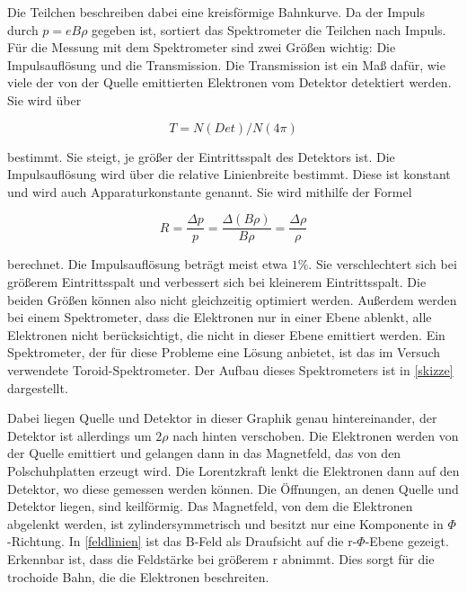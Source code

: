 Die Teilchen beschreiben dabei eine kreisförmige Bahnkurve. Da der Impuls durch $p = eB\rho$ gegeben ist, sortiert das Spektrometer die Teilchen nach Impuls. Für die Messung mit dem Spektrometer sind zwei Größen wichtig: Die Impulsauflösung und die Transmission. Die Transmission ist ein Maß dafür, wie viele der von der Quelle emittierten Elektronen vom Detektor detektiert werden. Sie wird über

\begin{equation}
T = N(Det)/N(4\pi)
\label{eq:transmission}
\end{equation}

bestimmt. Sie steigt, je größer der Eintrittsspalt des Detektors ist. Die Impulsauflösung wird über die relative Linienbreite bestimmt. Diese ist konstant und wird auch Apparaturkonstante genannt. Sie wird mithilfe der Formel

\begin{equation}
R = \frac{\Delta p}{p} = \frac{\Delta(B\rho)}{B\rho} = \frac{\Delta\rho}{\rho}
\label{eq:apparaturkonstante}
\end{equation}

berechnet. Die Impulsauflösung beträgt meist etwa $1\%$. Sie verschlechtert sich bei größerem Eintrittsspalt und verbessert sich bei kleinerem Eintrittsspalt. Die beiden Größen können also nicht gleichzeitig optimiert werden. Außerdem werden bei einem Spektrometer, dass die Elektronen nur in einer Ebene ablenkt, alle Elektronen nicht berücksichtigt, die nicht in dieser Ebene emittiert werden. Ein Spektrometer, der für diese Probleme eine Lösung anbietet, ist das im Versuch verwendete Toroid-Spektrometer. Der Aufbau dieses Spektrometers ist in \cref{skizze} dargestellt.


Dabei liegen Quelle und Detektor in dieser Graphik genau hintereinander, der Detektor ist allerdings um $2\rho$ nach hinten verschoben. Die Elektronen werden von der Quelle emittiert und gelangen dann in das Magnetfeld, das von den Polschuhplatten erzeugt wird. Die Lorentzkraft lenkt die Elektronen dann auf den Detektor, wo diese gemessen werden können. Die Öffnungen, an denen Quelle und Detektor liegen, sind keilförmig. Das Magnetfeld, von dem die Elektronen abgelenkt werden, ist zylindersymmetrisch und besitzt nur eine Komponente in $\Phi$-Richtung. In \cref{feldlinien} ist das B-Feld als Draufsicht auf die r-$\Phi$-Ebene gezeigt. Erkennbar ist, dass die Feldstärke bei größerem r abnimmt. Dies sorgt für die trochoide Bahn, die die Elektronen beschreiten. 

